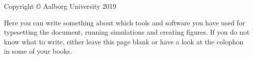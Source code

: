 \thispagestyle{empty}
{\small
\strut\vfill %
\noindent Copyright \copyright{} Aalborg University 2019\par
\vspace{0.2cm}
\noindent Here you can write something about which tools and software you have used for typesetting the document, running simulations and creating figures. If you do not know what to write, either leave this page blank or have a look at the colophon in some of your books.
}
\clearpage